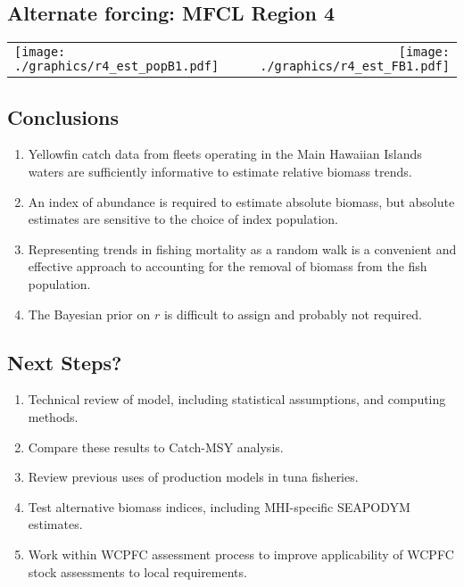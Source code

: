 \documentclass[letterpaper,KOMA,landscape,titlepage]{powersem}
\begin{document}
\begin{slide}\section{Alternate forcing: MFCL Region 4}
\label{fig:estr4}
\begin{center}
\begin{tabular}{lr}
\texttt{[image: ./graphics/r4\_est\_popB1.pdf]}&
\texttt{[image: ./graphics/r4\_est\_FB1.pdf]}\\
\end{tabular}
\end{center}
\end{slide}

\begin{slide}\section{Conclusions}
\begin{enumerate}
\item Yellowfin catch data from fleets operating in the Main Hawaiian
Islands waters are sufficiently informative to estimate relative
biomass trends.
\item An index of abundance is required to estimate absolute biomass,
but absolute estimates are sensitive to the choice of index
population.
\item Representing trends in fishing mortality as a random walk is a
convenient and effective approach to accounting for the removal of
biomass from the fish population.
\item The Bayesian prior on $r$ is difficult to assign and probably not required.
\end{enumerate}
\end{slide}

\begin{slide}\section{Next Steps?}
\begin{enumerate}
\item Technical review of model, including statistical assumptions,
and computing methods.
\item Compare these results to Catch-MSY analysis. 
\item Review previous uses of production models in tuna fisheries.
\item Test alternative biomass indices, including MHI-specific
SEAPODYM estimates.
\item Work within WCPFC assessment process to improve applicability of
WCPFC stock assessments to local requirements.
\end{enumerate}
\end{slide}
\end{document}
